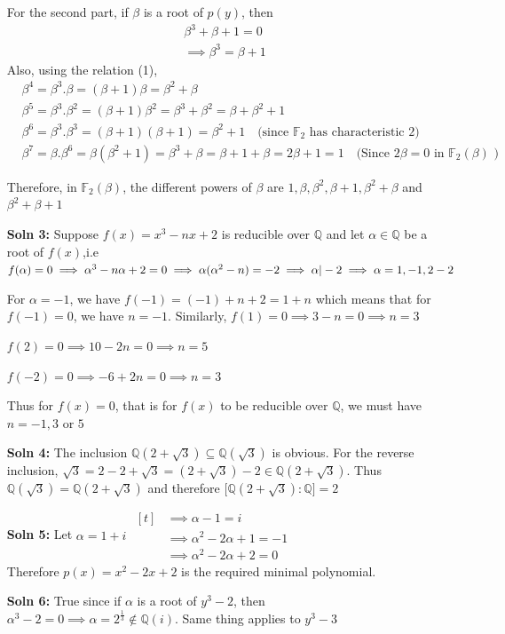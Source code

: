 \documentclass[12pt]{article}
\begin{document}
\begin{enumerate}
    
    For the second part, if $\beta$ is a root of $p(y)$, then 
    \begin{align*}
        &\beta^3+\beta +1=0 \\
     &\implies \beta^3=\beta +1 \tag{1}
    \end{align*} 
    Also, using the relation (1),
    \begin{align*}
        &\beta^4=\beta^3.\beta=(\beta +1)\beta=\beta^2+\beta\\ 
        &\beta^5=\beta^3.\beta^2=(\beta+1)\beta^2=\beta^3+\beta^2=\beta+\beta^2+1\\
        &\beta^6=\beta^3.\beta^3=(\beta +1)(\beta+1)=\beta^2+1 \quad \text{(since $\mathbb{F}_2$ has characteristic 2)} \\
        &\beta^7=\beta.\beta^6=\beta(\beta^2+1)=\beta^3+\beta =\beta+1+\beta=2\beta+1=1 \quad \text{(Since $2\beta=0$ in $\mathbb{F}_2(\beta)$ )}
    \end{align*}

    Therefore, in $\mathbb{F}_2(\beta)$, the different powers of $\beta$ are $1, \beta, \beta^2,\beta+1,\beta^2+\beta$ and $\beta^2+\beta+1$
    \item[\bf{Soln 3:} ] Suppose $f(x)=x^3-nx+2 $ is reducible over $\mathbb{Q}$ and let $\alpha \in \mathbb{Q}$ be a root of $f(x)$,i.e $f(\alpha)=0\\
    \implies \alpha^3-n\alpha+2=0 \\
    \implies \alpha(\alpha^2-n)=-2 \\
    \implies \alpha|-2
    \implies \alpha=1,-1,2-2$

    For $\alpha=-1$, we have
    $f(-1)= (-1)+n+2=1+n$
    which means that for $f(-1)=0$, we have $n=-1$.
    Similarly, $f(1)=0
    \implies 3-n=0
    \implies n=3$


    $f(2)=0
    \implies 10-2n=0
    \implies n=5$


    $f(-2)=0
    \implies -6+2n=0
    \implies n=3$

    
    Thus for $f(x)=0$, that is for $f(x)$ to be reducible over $\mathbb{Q}$, we must have $n=-1,3$ or $5$

    \item[\bf{Soln 4}: ] The inclusion $\mathbb{Q}(2 + \sqrt3) \subseteq \mathbb{Q}(\sqrt3)$ is obvious. For the reverse inclusion, $\sqrt3=2-2+\sqrt3 =(2+\sqrt3)-2\in \mathbb{Q}(2+\sqrt3)$. Thus $\mathbb{Q}(\sqrt3)=\mathbb{Q}(2+\sqrt3)$ and therefore $[\mathbb{Q}(2+\sqrt3):\mathbb{Q]}=2$
    \item[\bf{Soln 5}: ] Let $\alpha=1+i$
    $\begin{aligned}[t]
        &\implies \alpha-1=i\\
        &\implies \alpha^2-2\alpha+1=-1\\ 
        &\implies \alpha^2-2\alpha+2=0
    \end{aligned}$\\
    Therefore $p(x)=x^2 - 2x+2$ is the required minimal polynomial.
    \item[\bf{Soln 6}: ] True since if $\alpha$ is a root of $y^3-2$, then $\alpha^3 -2=0 \implies \alpha = 2^{\frac{1}{3}} \notin \mathbb{Q}(i)$. Same thing applies to $y^3-3$
    

\end{enumerate}
\end{document}
